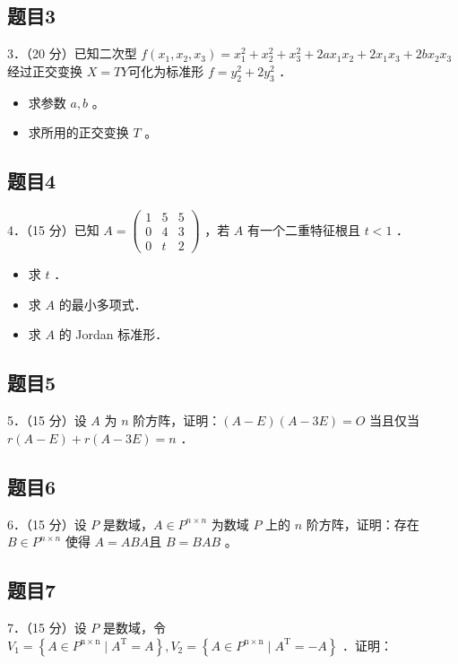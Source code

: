 \documentclass{article}
\begin{document}
\subsection{题目3}
3．（20 分）已知二次型 \(f\left(x_{1}, x_{2}, x_{3}\right)=x_{1}^{2}+x_{2}^{2}+x_{3}^{2}+2 a x_{1} x_{2}+2 x_{1} x_{3}+2 b x_{2} x_{3}\) 经过正交变换 \(X=T Y\)可化为标准形 \(f=y_{2}^{2}+2 y_{3}^{2}\) ．

\begin{itemize}
  \item[（1）] 求参数 \(a, b\) 。
  \item[（2）] 求所用的正交变换 \(T\) 。
\end{itemize}

\subsection{题目4}
4．（15 分）已知 \(A=\left(\begin{array}{lll}1 & 5 & 5 \\ 0 & 4 & 3 \\ 0 & t & 2\end{array}\right)\) ，若 \(A\) 有一个二重特征根且 \(t<1\) ．

\begin{itemize}
  \item[（1）] 求 \(t\) ．
  \item[（2）] 求 \(A\) 的最小多项式．
  \item[（3）] 求 \(A\) 的 Jordan 标准形．
\end{itemize}

\subsection{题目5}
5．（15 分）设 \(A\) 为 \(n\) 阶方阵，证明：\((A-E)(A-3 E)=O\) 当且仅当 \(r(A-E)+r(A-3 E)=n\) ．

\subsection{题目6}
6．（15 分）设 \(P\) 是数域，\(A \in P^{n \times n}\) 为数域 \(P\) 上的 \(n\) 阶方阵，证明：存在 \(B \in P^{n \times n}\) 使得 \(A=A B A\)且 \(B=B A B\) 。

\subsection{题目7}
7．（15 分）设 \(P\) 是数域，令 \(V_{1}=\left\{A \in P^{\mathrm{n} \times \mathrm{n}} \mid A^{\mathrm{T}}=A\right\}, V_{2}=\left\{A \in P^{\mathrm{n} \times \mathrm{n}} \mid A^{\mathrm{T}}=-A\right\}\) ．证明：
\end{document}
